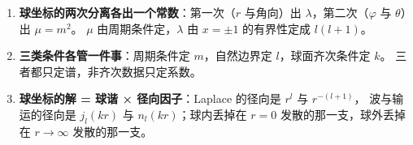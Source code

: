 \label{sec:s10}

\begin{enumerate}[label=\textbf{(\arabic*)}]
  \item \textbf{球坐标的两次分离各出一个常数}：第一次（$r$ 与角向）出 $\lambda$，第二次（$\varphi$ 与 $\theta$）出 $\mu=m^2$。
        $\mu$ 由周期条件定，$\lambda$ 由 $x=\pm1$ 的有界性定成 $l(l+1)$。
  \item \textbf{三类条件各管一件事}：周期条件定 $m$，自然边界定 $l$，球面齐次条件定 $k$。
        三者都只定谱，非齐次数据只定系数。
  \item \textbf{球坐标的解 = 球谐 × 径向因子}：Laplace 的径向是 $r^l$ 与 $r^{-(l+1)}$，
        波与输运的径向是 $j_l(kr)$ 与 $n_l(kr)$；球内丢掉在 $r=0$ 发散的那一支，球外丢掉在 $r\to\infty$ 发散的那一支。
\end{enumerate}

\clearpage
